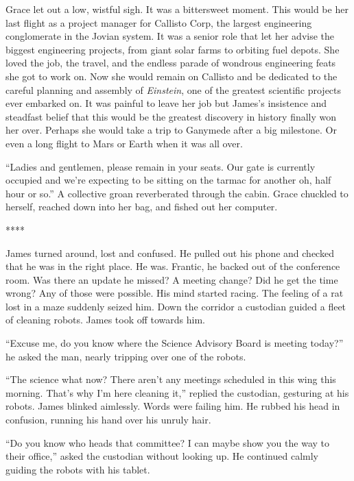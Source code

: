 \documentclass[openany, 12pt]{book} %
\begin{document}
Grace let out a low, wistful sigh. It was a bittersweet moment. This would be her last flight as a project manager for Callisto Corp, the largest engineering conglomerate in the Jovian system. It was a senior role that let her advise the biggest engineering projects, from giant solar farms to orbiting fuel depots. She loved the job, the travel, and the endless parade of wondrous engineering feats she got to work on. Now she would remain on Callisto and be dedicated to the careful planning and assembly of \textit{Einstein}, one of the greatest scientific projects ever embarked on. It was painful to leave her job but James's insistence and steadfast belief that this would be the greatest discovery in history finally won her over. Perhaps she would take a trip to Ganymede after a big milestone. Or even a long flight to Mars or Earth when it was all over.

``Ladies and gentlemen, please remain in your seats. Our gate is currently occupied and we're expecting to be sitting on the tarmac for another oh, half hour or so.'' A collective groan reverberated through the cabin. Grace chuckled to herself, reached down into her bag, and fished out her computer.

\begin{center}
****
\end{center}

James turned around, lost and confused. He pulled out his phone and checked that he was in the right place. He was. Frantic, he backed out of the conference room. Was there an update he missed? A meeting change? Did he get the time wrong? Any of those were possible. His mind started racing. The feeling of a rat lost in a maze suddenly seized him. Down the corridor a custodian guided a fleet of cleaning robots. James took off towards him.

``Excuse me, do you know where the Science Advisory Board is meeting today?'' he asked the man, nearly tripping over one of the robots.

``The science what now? There aren't any meetings scheduled in this wing this morning. That's why I'm here cleaning it,'' replied the custodian, gesturing at his robots. James blinked aimlessly. Words were failing him. He rubbed his head in confusion, running his hand over his unruly hair.

``Do you know who heads that committee? I can maybe show you the way to their office,'' asked the custodian without looking up. He continued calmly guiding the robots with his tablet.
\end{document}
